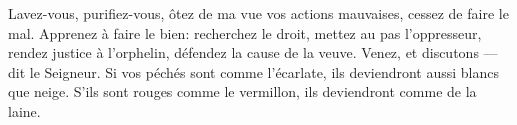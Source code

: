 Lavez-vous, purifiez-vous,
	ôtez de ma vue vos actions mauvaises, cessez de faire le mal.
Apprenez à faire le bien:
	recherchez le droit, mettez au pas l’oppresseur,
	rendez justice à l’orphelin, défendez la cause de la veuve.
Venez, et discutons --- dit le Seigneur.
Si vos péchés sont comme l’écarlate, ils deviendront aussi blancs que neige.
	S’ils sont rouges comme le vermillon, ils deviendront comme de la laine.

